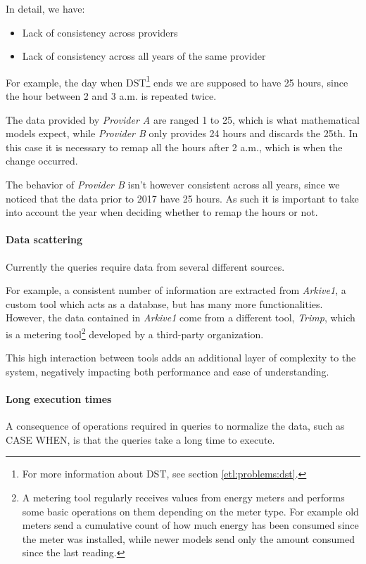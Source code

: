         In detail, we have:
            \begin{itemize}
                \item Lack of consistency across providers
                \item Lack of consistency across all years of the same provider
            \end{itemize}

        For example, the day when DST\footnote{For more information about DST, see section \ref{etl:problems:dst}.} ends we are supposed to have 25 hours, since the hour between 2 and 3 a.m. is repeated twice.
        
        The data provided by \textit{Provider A} are ranged 1 to 25, which is what mathematical models expect, while \textit{Provider B} only provides 24 hours and discards the 25th.
        In this case it is necessary to remap all the hours after 2 a.m., which is when the change occurred.
        
        The behavior of \textit{Provider B} isn't however consistent across all years, since we noticed that the data prior to 2017 have 25 hours.
        As such it is important to take into account the year when deciding whether to remap the hours or not.
        
    \paragraph{Data scattering}
        Currently the queries require data from several different sources.
        
        For example, a consistent number of information are extracted from \textit{Arkive1}, a custom tool which acts as a database, but has many more functionalities.
        However, the data contained in \textit{Arkive1} come from a different  tool, \textit{Trimp}, which is a metering tool\footnote{A metering tool regularly receives values from energy meters and performs some basic operations on them depending on the meter type.
        For example old meters send a cumulative count of how much energy has been consumed since the meter was installed, while newer models send only the amount consumed since the last reading.} developed by a third-party organization.\reword
        
        This high interaction between tools adds an additional layer of complexity to the system, negatively impacting both performance and ease of understanding.\reword
        
    \paragraph{Long execution times}
        A consequence of operations required in queries to normalize the data, such as CASE WHEN, is that the queries take a long time to execute.
        
